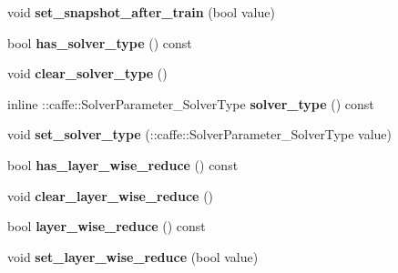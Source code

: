 \begin{DoxyCompactItemize}
\item 
\mbox{\label{classcaffe_1_1_solver_parameter_a89dd1f838c6e47fe4b14ab534b50cf2f}} 
void {\bfseries set\+\_\+snapshot\+\_\+after\+\_\+train} (bool value)
\item 
\mbox{\label{classcaffe_1_1_solver_parameter_a095c8f45e1c69a6a33c85c80a267b137}} 
bool {\bfseries has\+\_\+solver\+\_\+type} () const
\item 
\mbox{\label{classcaffe_1_1_solver_parameter_a9eb40ae6bc67bee1f35bbd3e2e047bf7}} 
void {\bfseries clear\+\_\+solver\+\_\+type} ()
\item 
\mbox{\label{classcaffe_1_1_solver_parameter_a41c83b91aefecd43d948a9771cdb1a8f}} 
inline \+::caffe\+::\+Solver\+Parameter\+\_\+\+Solver\+Type {\bfseries solver\+\_\+type} () const
\item 
\mbox{\label{classcaffe_1_1_solver_parameter_a8fceb86131243d2b2817e8a27217bdcd}} 
void {\bfseries set\+\_\+solver\+\_\+type} (\+::caffe\+::\+Solver\+Parameter\+\_\+\+Solver\+Type value)
\item 
\mbox{\label{classcaffe_1_1_solver_parameter_a2730782e4347d4a4519e912706012bcc}} 
bool {\bfseries has\+\_\+layer\+\_\+wise\+\_\+reduce} () const
\item 
\mbox{\label{classcaffe_1_1_solver_parameter_abfcb84c800acefd7883f7a98e82d0457}} 
void {\bfseries clear\+\_\+layer\+\_\+wise\+\_\+reduce} ()
\item 
\mbox{\label{classcaffe_1_1_solver_parameter_ae7d2e6596a8c2c2fa724433828afade6}} 
bool {\bfseries layer\+\_\+wise\+\_\+reduce} () const
\item 
\mbox{\label{classcaffe_1_1_solver_parameter_ab6486fb03e113a3bda2c3aa9c49a1fce}} 
void {\bfseries set\+\_\+layer\+\_\+wise\+\_\+reduce} (bool value)
\item 
\mbox{\label{classcaffe_1_1_solver_parameter_a004317c247cec3326e4a4545d240e852}} 

\end{DoxyCompactItemize}
